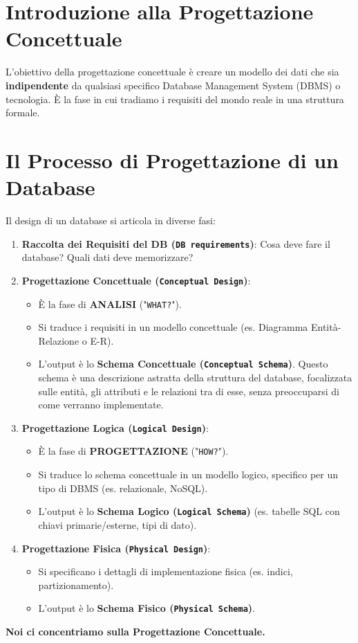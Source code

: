 \section{Introduzione alla Progettazione Concettuale}
L'obiettivo della progettazione concettuale è creare un modello dei dati che sia \textbf{indipendente} da qualsiasi specifico Database Management System (DBMS) o tecnologia. È la fase in cui tradiamo i requisiti del mondo reale in una struttura formale.

\section{Il Processo di Progettazione di un Database}
Il design di un database si articola in diverse fasi:
\begin{enumerate}
	\item \textbf{Raccolta dei Requisiti del DB (\texttt{DB requirements})}: Cosa deve fare il database? Quali dati deve memorizzare?
	\item \textbf{Progettazione Concettuale (\texttt{Conceptual Design})}:
	\begin{itemize}
		\item È la fase di \textbf{ANALISI} ("\texttt{WHAT?}").
		\item Si traduce i requisiti in un modello concettuale (es. Diagramma Entità-Relazione o E-R).
		\item L'output è lo \textbf{Schema Concettuale (\texttt{Conceptual Schema})}. Questo schema è una descrizione astratta della struttura del database, focalizzata sulle entità, gli attributi e le relazioni tra di esse, senza preoccuparsi di come verranno implementate.
	\end{itemize}
	\item \textbf{Progettazione Logica (\texttt{Logical Design})}:
	\begin{itemize}
		\item È la fase di \textbf{PROGETTAZIONE} ("\texttt{HOW?}").
		\item Si traduce lo schema concettuale in un modello logico, specifico per un tipo di DBMS (es. relazionale, NoSQL).
		\item L'output è lo \textbf{Schema Logico (\texttt{Logical Schema})} (es. tabelle SQL con chiavi primarie/esterne, tipi di dato).
	\end{itemize}
	\item \textbf{Progettazione Fisica (\texttt{Physical Design})}:
	\begin{itemize}
		\item Si specificano i dettagli di implementazione fisica (es. indici, partizionamento).
		\item L'output è lo \textbf{Schema Fisico (\texttt{Physical Schema})}.
	\end{itemize}
\end{enumerate}
\textbf{Noi ci concentriamo sulla Progettazione Concettuale.}


